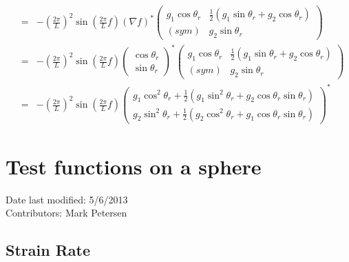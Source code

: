\documentclass[11pt]{report}
\begin{document}
\begin{eqnarray}
&=& -\left(\frac{2\pi}{L}\right)^2
\sin{\left(\frac{2\pi}{L}f\right)}\left( \nabla f \right)^* 
\left(\begin{array}{cc} g_1\cos{\theta_r} & \frac{1}{2}\left( g_1\sin{\theta_r} + g_2\cos{\theta_r} \right)\\
                      (sym) & g_2\sin{\theta_r}  \end{array} \right)\\
&=& -\left(\frac{2\pi}{L}\right)^2
\sin{\left(\frac{2\pi}{L}f\right)}
\left( \begin{array}{c} \cos{\theta_r} \\ \sin{\theta_r} \end{array}    \right)  ^* 
\left(\begin{array}{cc} g_1\cos{\theta_r} & \frac{1}{2}\left( g_1\sin{\theta_r} + g_2\cos{\theta_r} \right)\\
                      (sym) & g_2\sin{\theta_r}  \end{array} \right)\\
&=& -\left(\frac{2\pi}{L}\right)^2
\sin{\left(\frac{2\pi}{L}f\right)}
\left(\begin{array}{c} g_1\cos^2{\theta_r} + \frac{1}{2}\left( g_1\sin^2{\theta_r} + g_2\cos{\theta_r}\sin{\theta_r} \right)\\
                       g_2\sin^2{\theta_r} + \frac{1}{2}\left( g_2\cos^2{\theta_r} + g_1\cos{\theta_r}\sin{\theta_r} \right) 
 \end{array} \right)^* 
\end{eqnarray}

\section{Test functions on a sphere}
Date last modified: 5/6/2013 \\
Contributors: Mark Petersen \\

\subsection{Strain Rate}
\end{document}
